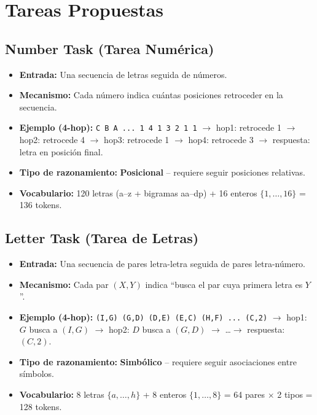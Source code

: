 \documentclass[conference]{IEEEtran}
\begin{document}
\section{Tareas Propuestas}

\subsection{Number Task (Tarea Num\'erica)}

\begin{itemize}
    \item \textbf{Entrada:} Una secuencia de letras seguida de n\'umeros.
    \item \textbf{Mecanismo:} Cada n\'umero indica cu\'antas posiciones retroceder en la secuencia.
    \item \textbf{Ejemplo (4-hop):} \texttt{C B A ... 1 4 1 3 2 1 1} $\rightarrow$ hop1: retrocede 1 $\rightarrow$ hop2: retrocede 4 $\rightarrow$ hop3: retrocede 1 $\rightarrow$ hop4: retrocede 3 $\rightarrow$ respuesta: letra en posici\'on final.
    \item \textbf{Tipo de razonamiento:} \textbf{Posicional} -- requiere seguir posiciones relativas.
    \item \textbf{Vocabulario:} 120 letras (a--z + bigramas aa--dp) + 16 enteros $\{1,\dots,16\}$ = 136 tokens.
\end{itemize}

\subsection{Letter Task (Tarea de Letras)}

\begin{itemize}
    \item \textbf{Entrada:} Una secuencia de pares letra-letra seguida de pares letra-n\'umero.
    \item \textbf{Mecanismo:} Cada par $(X,Y)$ indica ``busca el par cuya primera letra es $Y$''.
    \item \textbf{Ejemplo (4-hop):} \texttt{(I,G) (G,D) (D,E) (E,C) (H,F) ... (C,2)} $\rightarrow$ hop1: $G$ busca a $(I,G)$ $\rightarrow$ hop2: $D$ busca a $(G,D)$ $\rightarrow$ \dots $\rightarrow$ respuesta: $(C,2)$.
    \item \textbf{Tipo de razonamiento:} \textbf{Simb\'olico} -- requiere seguir asociaciones entre s\'imbolos.
    \item \textbf{Vocabulario:} 8 letras $\{a,\dots,h\}$ + 8 enteros $\{1,\dots,8\}$ = 64 pares $\times$ 2 tipos = 128 tokens.
\end{itemize}
\end{document}
